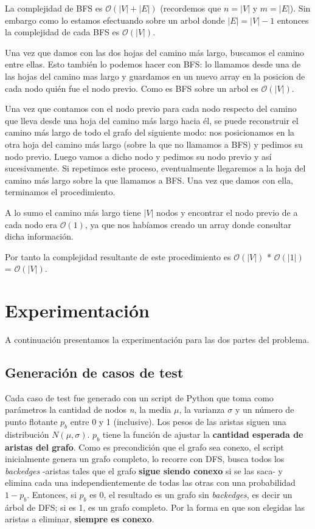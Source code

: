 \documentclass[a4paper]{report}
\begin{document}
La complejidad de BFS es $\mathcal{O}(|V| + |E|)$ (recordemos que $n = |V|$ y $m = |E|$). Sin embargo como lo estamos efectuando sobre un arbol donde $|E| = |V| - 1$ entonces la complejidad de cada BFS es $\mathcal{O}(|V|)$.

Una vez que damos con las dos hojas del camino más largo, buscamos el camino entre ellas. Esto también lo podemos hacer con BFS: lo llamamos desde una de las hojas del camino mas largo y guardamos en un nuevo array en la posicion de cada nodo quién fue el nodo previo. Como es BFS sobre un arbol es $\mathcal{O}(|V|)$.

Una vez que contamos con el nodo previo para cada nodo respecto del camino que lleva desde una hoja del camino más largo hacia él, se puede reconstruir el camino más largo de todo el grafo del siguiente modo: nos posicionamos en la otra hoja del camino más largo (sobre la que no llamamos a BFS) y pedimos su nodo previo. Luego vamos a dicho nodo y pedimos su nodo previo y así sucesivamente. Si repetimos este proceso, eventualmente llegaremos a la hoja del camino más largo sobre la que llamamos a BFS. Una vez que damos con ella, terminamos el procedimiento.

A lo sumo el camino más largo tiene $|V|$ nodos y encontrar el nodo previo de a cada nodo era $\mathcal{O}(1)$, ya que nos habíamos creado un array donde consultar dicha información. 

Por tanto la complejidad resultante de este procedimiento es $\mathcal{O}(|V|)$ * $\mathcal{O}(|1|)$ = $\mathcal{O}(|V|)$.

\section{Experimentación}

A continuación presentamos la experimentación para las dos partes del problema.

\subsection{Generación de casos de test}

Cada caso de test fue generado con un script de Python que toma como parámetros la cantidad de nodos \textit{n}, la media $\mu$, la varianza $\sigma$ y un número de punto flotante $p_{b}$ entre 0 y 1 (inclusive). Los pesos de las aristas siguen una distribución $N(\mu, \sigma)$. $p_{b}$ tiene la función de ajustar la \textbf{cantidad esperada de aristas del grafo}. Como es precondición que el grafo sea conexo, el script inicialmente genera un grafo completo, lo recorre con DFS, busca todos los \textit{backedges} -aristas tales que el grafo \textbf{sigue siendo conexo} si se las saca- y elimina cada una independientemente de todas las otras con una probabilidad $1 - p_{b}$. Entonces, si $p_{b}$ es 0, el resultado es un grafo sin \textit{backedges}, es decir un árbol de DFS; si es 1, es un grafo completo. Por la forma en que son elegidas las aristas a eliminar, \textbf{siempre es conexo}.
\end{document}
